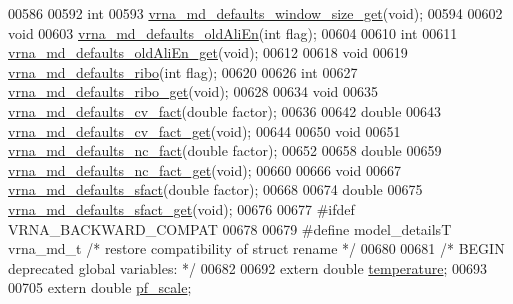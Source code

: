 \begin{DoxyCode}
00586 
00592 \textcolor{keywordtype}{int}
00593 \hyperlink{group__model__details_ga670146a9aa3ba77f4d422d60b7c30ac9}{vrna\_md\_defaults\_window\_size\_get}(\textcolor{keywordtype}{void});
00594 
00602 \textcolor{keywordtype}{void}
00603 \hyperlink{group__model__details_ga41521d5b9fb7e0f31e7ea73f5792afab}{vrna\_md\_defaults\_oldAliEn}(\textcolor{keywordtype}{int} flag);
00604 
00610 \textcolor{keywordtype}{int}
00611 \hyperlink{group__model__details_ga2374492b5019df88022fe4c05f0f3630}{vrna\_md\_defaults\_oldAliEn\_get}(\textcolor{keywordtype}{void});
00612 
00618 \textcolor{keywordtype}{void}
00619 \hyperlink{group__model__details_ga937c45e1d06fd6168730a9b08d130be3}{vrna\_md\_defaults\_ribo}(\textcolor{keywordtype}{int} flag);
00620 
00626 \textcolor{keywordtype}{int}
00627 \hyperlink{group__model__details_ga169027f0c0561ea7d87b655e4b336bfc}{vrna\_md\_defaults\_ribo\_get}(\textcolor{keywordtype}{void});
00628 
00634 \textcolor{keywordtype}{void}
00635 \hyperlink{group__model__details_gad3a3f40baafd91a6ce80a91a68e20053}{vrna\_md\_defaults\_cv\_fact}(\textcolor{keywordtype}{double} factor);
00636 
00642 \textcolor{keywordtype}{double}
00643 \hyperlink{group__model__details_gae59c68393807217b0a2497adb64d3ee3}{vrna\_md\_defaults\_cv\_fact\_get}(\textcolor{keywordtype}{void});
00644 
00650 \textcolor{keywordtype}{void}
00651 \hyperlink{group__model__details_gac35e596c850dce3ad55c49119fd7d471}{vrna\_md\_defaults\_nc\_fact}(\textcolor{keywordtype}{double} factor);
00652 
00658 \textcolor{keywordtype}{double}
00659 \hyperlink{group__model__details_ga7ac759eaa7159bf5f022745f5da59508}{vrna\_md\_defaults\_nc\_fact\_get}(\textcolor{keywordtype}{void});
00660 
00666 \textcolor{keywordtype}{void}
00667 \hyperlink{group__model__details_ga3f73d3029d3d0025d4cc311510cd95a3}{vrna\_md\_defaults\_sfact}(\textcolor{keywordtype}{double} factor);
00668 
00674 \textcolor{keywordtype}{double}
00675 \hyperlink{group__model__details_gab2df6aab954b63fd3592d18e90285dae}{vrna\_md\_defaults\_sfact\_get}(\textcolor{keywordtype}{void});
00676 
00677 \textcolor{preprocessor}{#ifdef  VRNA\_BACKWARD\_COMPAT}
00678 
00679 \textcolor{preprocessor}{#define model\_detailsT        vrna\_md\_t               }\textcolor{comment}{/* restore compatibility of struct rename */}\textcolor{preprocessor}{}
00680 
00681 \textcolor{comment}{/* BEGIN deprecated global variables: */}
00682 
00692 \textcolor{keyword}{extern} \textcolor{keywordtype}{double} \hyperlink{group__model__details_gab4b11c8d9c758430960896bc3fe82ead}{temperature};
00693 
00705 \textcolor{keyword}{extern} \textcolor{keywordtype}{double} \hyperlink{group__model__details_gad3b22044065acc6dee0af68931b52cfd}{pf\_scale};

\end{DoxyCode}
